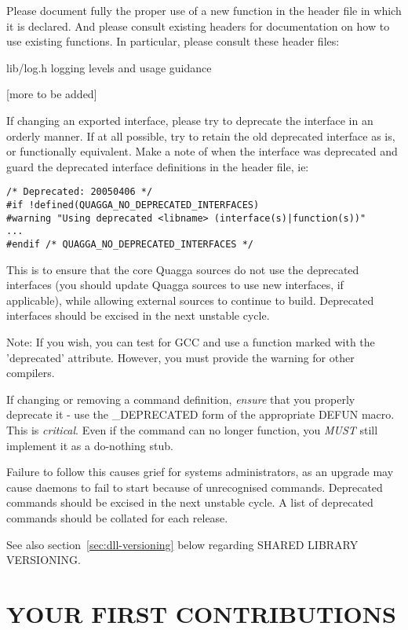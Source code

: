 \documentclass[oneside]{article}
\begin{document}
Please document fully the proper use of a new function in the header file
in which it is declared.  And please consult existing headers for
documentation on how to use existing functions.  In particular, please consult
these header files:

\begin{description}
  \item{lib/log.h}	logging levels and usage guidance
  \item{[more to be added]}
\end{description}

If changing an exported interface, please try to deprecate the interface in
an orderly manner. If at all possible, try to retain the old deprecated
interface as is, or functionally equivalent. Make a note of when the
interface was deprecated and guard the deprecated interface definitions in
the header file, ie:

\begin{verbatim}
/* Deprecated: 20050406 */
#if !defined(QUAGGA_NO_DEPRECATED_INTERFACES)
#warning "Using deprecated <libname> (interface(s)|function(s))"
...
#endif /* QUAGGA_NO_DEPRECATED_INTERFACES */
\end{verbatim}

This is to ensure that the core Quagga sources do not use the deprecated
interfaces (you should update Quagga sources to use new interfaces, if
applicable), while allowing external sources to continue to build. 
Deprecated interfaces should be excised in the next unstable cycle.

Note: If you wish, you can test for GCC and use a function
marked with the 'deprecated' attribute. However, you must provide the
warning for other compilers.

If changing or removing a command definition, \emph{ensure} that you
properly deprecate it - use the \_DEPRECATED form of the appropriate DEFUN
macro.  This is \emph{critical}.  Even if the command can no longer
function, you \emph{MUST} still implement it as a do-nothing stub. 

Failure to follow this causes grief for systems administrators, as an
upgrade may cause daemons to fail to start because of unrecognised commands. 
Deprecated commands should be excised in the next unstable cycle.  A list of
deprecated commands should be collated for each release.

See also section~\ref{sec:dll-versioning} below regarding SHARED LIBRARY
VERSIONING.

\section{YOUR FIRST CONTRIBUTIONS}
\end{document}
